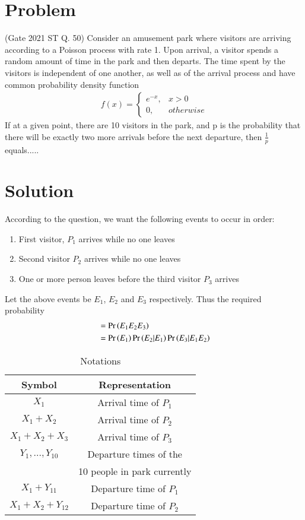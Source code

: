 \documentclass[journal,12pt,twocolumn]{IEEEtran}
\begin{document}
\section{Problem}
(Gate 2021 ST Q. 50) Consider an amusement park where visitors are arriving according to a Poisson process with rate 1. Upon arrival, a visitor spends a random amount of time in the park and then departs. The time spent by the visitors is independent of one another, as well as of the arrival process and have common probability density function 
\begin{align}
    f(x) = 
    \begin{cases}
        e^{-x}, & x > 0\\
        0,      & otherwise
    \end{cases}
\end{align}
If at a given point, there are 10 visitors in the park, and p is the probability that there will be exactly two more arrivals before the next departure, then $\frac{1}{p}$ equals.....

\section{Solution}
According to the question, we want the following events to occur in order: 
\begin{enumerate}
    \item First visitor, $P_1$ arrives while no one leaves
    \item Second visitor $P_2$ arrives while no one leaves
    \item One or more person leaves before the third visitor $P_3$ arrives
\end{enumerate}

Let the above events be $E_1$, $E_2$ and $E_3$ respectively. Thus the required probability
\begin{align}
    &= \Pr\left(E_1E_2E_3\right)\\
    &= \Pr\left(E_1\right)\Pr\left(E_2|E_1\right)\Pr\left(E_3|E_1E_2\right)\label{Requiredprobability}
\end{align}

\begin{table}
    \centering
    \begin{tabular}{|c|c|}
    \hline
    Symbol  & Representation  \\
    \hline
    $X_1$            & Arrival time of $P_1$  \\
    $X_1+X_2$        & Arrival time of $P_2$  \\
    $X_1+X_2+X_3$    & Arrival time of $P_3$  \\
    \hline
    $Y_1,...,Y_{10}$ & Departure times of the  \\
                     & 10 people in park currently\\
    \hline
    $X_1+Y_{11}$     & Departure time of $P_1$\\
    $X_1+X_2+Y_{12}$ & Departure time of $P_2$\\
    \hline
    \end{tabular}
    \caption{Notations}
    \label{tab:my_label}
\end{table}
\end{document}
